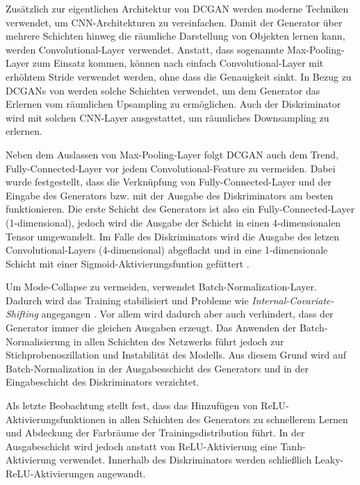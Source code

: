 Zusätzlich zur eigentlichen Architektur von DCGAN werden moderne Techniken
verwendet, um CNN-Architekturen zu vereinfachen.  Damit der Generator über
mehrere Schichten hinweg die räumliche Darstellung von Objekten lernen kann,
werden Convolutional-Layer verwendet. Anstatt, dass sogenannte
Max-Pooling-Layer zum Einsatz kommen, können nach
\cite{springenberg2015striving} einfach Convolutional-Layer mit erhöhtem
Stride verwendet werden, ohne dass die Genauigkeit sinkt. In Bezug zu DCGANs
von \cite{radford2016unsupervised} werden solche Schichten verwendet, um dem
Generator das Erlernen vom räumlichen Upsampling zu ermöglichen. Auch der
Diskriminator wird mit solchen CNN-Layer ausgestattet, um räumliches
Downsampling zu erlernen.

Neben dem Auslassen von Max-Pooling-Layer folgt DCGAN auch dem Trend,
Fully-Connected-Layer vor jedem Convolutional-Feature zu vermeiden. Dabei
wurde festgestellt, dass die Verknüpfung von Fully-Connected-Layer und der
Eingabe des Generators bzw. mit der Ausgabe des Diskriminators am besten
funktionieren. Die erste Schicht des Generators ist also ein
Fully-Connected-Layer (1-dimensional), jedoch wird die Ausgabe der Schicht in
einen 4-dimensionalen Tensor umgewandelt. Im Falle des Diskriminators wird die
Ausgabe des letzen Convolutional-Layers (4-dimensional) abgeflacht und in eine
1-dimensionale Schicht mit einer Sigmoid-Aktivierungsfuntion gefüttert
\cite{radford2016unsupervised}.

Um Mode-Collapse zu vermeiden, verwendet \cite{radford2016unsupervised}
Batch-Normalization-Layer. Dadurch wird das Training stabilisiert und Probleme
wie \textit{Internal-Covariate-Shifting} angegangen \cite{pmlr-v37-ioffe15}.
Vor allem wird dadurch aber auch verhindert, dass der Generator immer die
gleichen Ausgaben erzeugt. Das Anwenden der Batch-Normalisierung in allen
Schichten des Netzwerks führt jedoch zur Stichprobenoszillation und
Instabilität des Modells. Aus diesem Grund wird auf Batch-Normalization in der
Ausgabesschicht des Generators und in der Eingabeschicht des Diskriminators
verzichtet.

Als letzte Beobachtung stellt \cite{radford2016unsupervised} fest, dass das
Hinzufügen von ReLU-Ak\-ti\-vier\-ungs\-funk\-tio\-nen in allen Schichten des
Generators zu schnellerem Lernen und Abdeckung der Farbräume der
Trainingsdistribution führt. In der Ausgabeschicht wird jedoch anstatt von
ReLU-Aktivierung eine Tanh-Aktivierung verwendet. Innerhalb des Diskriminators
werden schließlich Leaky-ReLU-Aktivierungen angewandt.

